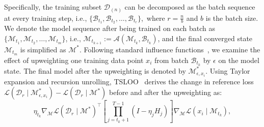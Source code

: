 
Specifically, the training subset $\mathcal{D}_{(n)}$ can be decomposed as the batch sequence at every training step, i.e., $\{\mathcal{B}_{t_1},\mathcal{B}_{t_2}, \dots , \mathcal{B}_{t_r}\}$,~where $r=\frac{n}{b}$ and $b$ is the batch size. We denote the model sequence after being trained on each batch as $\{\mathcal{M}_{t_1},\mathcal{M}_{t_2}, \dots , \mathcal{M}_{t_m}\}$, i.e., $\mathcal{M}_{t_{k+1}} := \mathcal{A}(\mathcal{M}_{t_k}, \mathcal{B}_{t_k})$, and the final converged state $\mathcal{M}_{t_m}$ is simplified as $\mathcal{M}^*$. Following standard influence functions~\cite{weisberg1982residuals,koh2017understanding}, we examine the effect of upweighting one training data point $x_i$ from batch $\mathcal{B}_{t_k}$ by $\epsilon$ on the model state. The final model after the upweighting is denoted by $\mathcal{M}^*_{\epsilon, x_i}$.
Using Taylor expansion and recursion unrolling, TSLOO~\cite{wang2024capturing} derives the change in reference loss $\mathcal{L}(\mathcal{D}_r \mid \mathcal{M}^*_{\epsilon, x_i}) - \mathcal{L}(\mathcal{D}_r \mid \mathcal{M}^*)$ before and after the upweighting as: 
\vskip -0.05in
{\fontsize{7.1}{5}\selectfont
\begin{equation}
    \eta_{t_k} \nabla_{\mathcal{M}} \mathcal{L}(\mathcal{D}_r \mid \mathcal{M}^*)^\top \left[ \prod_{j=t_k+1}^{T-1} \left(I - \eta_j H_j \right) \right] \nabla_{\mathcal{M}} \mathcal{L}(x_i \mid \mathcal{M}_{t_k}),
    \label{eq:wang}
\end{equation}
}



